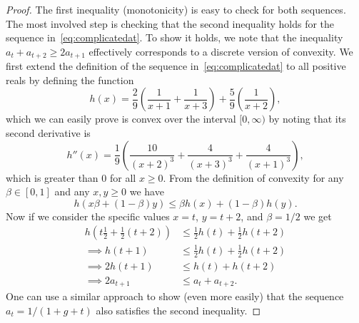 \lemboundingconstraints*
\begin{proof}
	The first inequality (monotonicity) is easy to check for both sequences. The most involved step is checking that the second inequality holds for the sequence in~\eqref{eq:complicatedat}. To show it holds, we note that the inequality $a_t +  a_{t+2} \geq 2a_{t+1}$ effectively corresponds to a discrete version of convexity. We first extend the definition of the sequence in~\eqref{eq:complicatedat} to all positive reals by defining the function
	\begin{equation*}
		h(x) = \frac{2}{9}\left( \frac{1}{x+1} + \frac{1}{x+3} \right) + \frac{5}{9} \left( \frac{1}{x+2} \right),
	\end{equation*}
	which we can easily prove is convex over the interval $[0,\infty)$ by noting that its second derivative is
	\[
		h''(x) = \frac{1}{9}\left( \frac{10}{(x+2)^3} + \frac{4}{(x+3)^3} + \frac{4}{(x+1)^3} \right),
	\]
	which is greater than $0$ for all $x \geq 0$. From the definition of convexity for any $\beta \in [0, 1]$ and any $x, y \geq 0$ we have
	\[
		h(x\beta + (1-\beta) y) \leq \beta h(x) + (1-\beta) h(y).
	\]
	Now if we consider the specific values $x=t$, $y=t+2$, and $\beta=1/2$ we get
	\begin{align*}
		h\left(t\frac{1}{2} + \frac{1}{2} (t+2)\right) & \leq \frac{1}{2} h(t) + \frac{1}{2} h(t+2) \\
		\implies  h(t+1)                               & \leq \frac{1}{2} h(t) + \frac{1}{2} h(t+2) \\
		\implies  2 h(t+1)                             & \leq h(t) + h(t+2)                         \\
		\implies 2a_{t+1}                              & \leq a_t + a_{t+2}.
	\end{align*}
	One can use a similar approach to show (even more easily) that the sequence $a_t = 1/(1+g+t)$ also satisfies the second inequality.
\end{proof}
